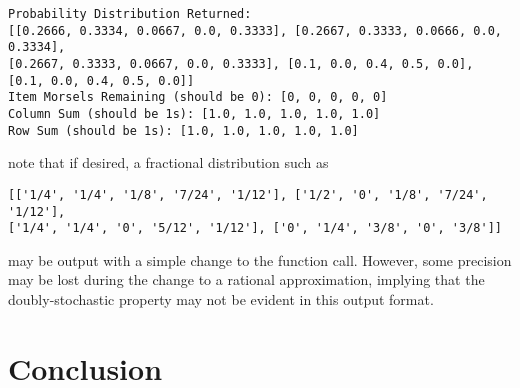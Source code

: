 \documentclass[12pt]{article}
\begin{document}
\begin{verbatim}
Probability Distribution Returned: 
[[0.2666, 0.3334, 0.0667, 0.0, 0.3333], [0.2667, 0.3333, 0.0666, 0.0, 0.3334],
[0.2667, 0.3333, 0.0667, 0.0, 0.3333], [0.1, 0.0, 0.4, 0.5, 0.0], 
[0.1, 0.0, 0.4, 0.5, 0.0]]
Item Morsels Remaining (should be 0): [0, 0, 0, 0, 0]
Column Sum (should be 1s): [1.0, 1.0, 1.0, 1.0, 1.0]
Row Sum (should be 1s): [1.0, 1.0, 1.0, 1.0, 1.0]
\end{verbatim}
\noindent note that if desired, a fractional distribution such as 
\begin{verbatim}
[['1/4', '1/4', '1/8', '7/24', '1/12'], ['1/2', '0', '1/8', '7/24', '1/12'],
['1/4', '1/4', '0', '5/12', '1/12'], ['0', '1/4', '3/8', '0', '3/8']]
\end{verbatim}
\noindent may be output with a simple change to the function call. However, some precision may be lost during the change to a rational approximation, implying that the doubly-stochastic property may not be evident in this output format.
\section*{Conclusion}
\end{document}
